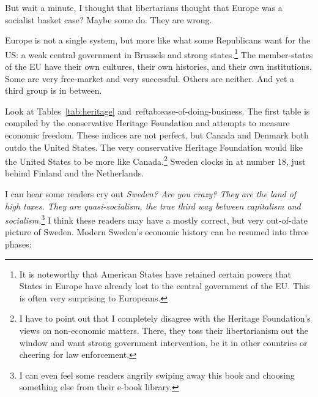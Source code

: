 But wait a minute, I thought that libertarians thought that Europe was a
socialist basket case? Maybe some do. They are wrong.

Europe is not a single system, but more like what some Republicans want for the
US: a weak central government in Brussels and strong states.\footnote{It is
noteworthy that American States have retained certain powers that States in
Europe have already lost to the central government of the EU. This is often
very surprising to Europeans.} The member-states of the EU have their own
cultures, their own histories, and their own institutions. Some are very
free-market and very successful. Others are neither. And yet a third group is
in between.

Look at Tables~\ref{tab:heritage} and~ref{tab:ease-of-doing-business}. The
first table is compiled by the conservative Heritage Foundation and attempts to
measure economic freedom. These indices are not perfect, but Canada and Denmark
both outdo the United States. The very conservative Heritage Foundation would
like the United States to be more like Canada.\footnote{I have to point out
that I completely disagree with the Heritage Foundation's views on non-economic
matters. There, they toss their libertarianism out the window and want strong
government intervention, be it in other countries or cheering for law
enforcement.} Sweden clocks in at number 18, just behind Finland and the
Netherlands.


I can hear some readers cry out \emph{Sweden? Are you crazy? They are the land
of high taxes. They are quasi-socialism, the true third way between capitalism
and socialism.}\footnote{I can even feel some readers angrily swiping away this
book and choosing something else from their e-book library.} I think these
readers may have a mostly correct, but very out-of-date picture of Sweden.
Modern Sweden's economic history can be resumed into three phases:

